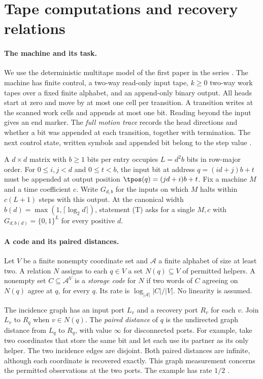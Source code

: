 \section{Tape computations and recovery relations}\label{sec:model}

\paragraph{The machine and its task.}
We use the deterministic multitape model of the first paper in the series
\cite{PaperOne}. The machine has finite control, a two-way read-only input
tape, $k\ge0$ two-way work tapes over a fixed finite alphabet, and an
append-only binary output. All heads start at zero and move by at most one
cell per transition. A transition writes at the scanned work cells and
appends at most one bit. Reading beyond the input gives an end marker.
The \emph{full motion trace} records the head directions and whether a bit
was appended at each transition, together with termination. The next control state, written symbols and appended bit belong to the
step value \cite[\S2]{PaperEleven}.

A $d\times d$ matrix with $b\ge1$ bits per entry occupies $L=d^2b$ bits in
row-major order. For $0\le i,j<d$ and $0\le t<b$, the input bit at address
$q=(id+j)b+t$ must be appended at output position
$\tpos(q)=(jd+i)b+t$. Fix a machine $M$ and a time coefficient $c$.
Write $G_{d,b}$ for the inputs on which $M$ halts within $c(L+1)$ steps
with this output. At the canonical width $b(d)=\max(1,\lceil\log_2 d\rceil)$,
statement \textnormal{(T)} asks for a single $M,c$ with
$G_{d,b(d)}=\{0,1\}^L$ for every positive $d$.

\paragraph{A code and its paired distances.}
Let $V$ be a finite nonempty coordinate set and $\mathcal A$ a finite
alphabet of size at least two. A relation $N$ assigns to each $q\in V$
a set $N(q)\subseteq V$ of permitted helpers. A nonempty set
$C\subseteq\mathcal A^V$ is a \emph{storage code} for $N$ if two words of
$C$ agreeing on $N(q)$ agree at $q$, for every $q$. Its rate is
$\log_{|\mathcal A|}|C|/|V|$. No linearity is assumed.

The incidence graph has an input port $L_v$ and a recovery port $R_v$
for each $v$. Join $L_v$ to $R_q$ when $v\in N(q)$. The \emph{paired
distance} of $q$ is the undirected graph distance from $L_q$ to $R_q$,
with value $\infty$ for disconnected ports. For example, take two
coordinates that store the same bit and let each use its partner as its
only helper. The two incidence edges are disjoint. Both paired distances
are infinite, although each coordinate is recovered exactly. This graph
measurement concerns the permitted observations at the two ports. The example has rate $1/2$ \cite[\S3]{PaperFive}.

